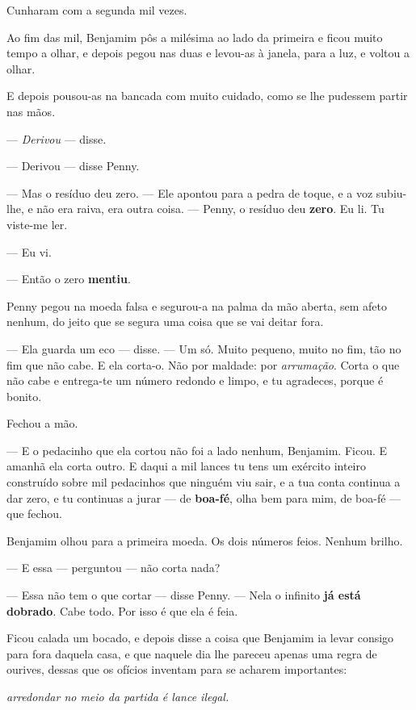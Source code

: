 \documentclass[livro.tex]{subfiles}
\begin{document}
Cunharam com a segunda mil vezes.

Ao fim das mil, Benjamim pôs a milésima ao lado da primeira e ficou muito tempo a olhar, e depois pegou nas duas e
levou-as à janela, para a luz, e voltou a olhar.

E depois pousou-as na bancada com muito cuidado, como se lhe pudessem partir nas mãos.

--- \emph{Derivou} --- disse.

--- Derivou --- disse Penny.

--- Mas o resíduo deu zero. --- Ele apontou para a pedra de toque, e a voz subiu-lhe, e não era raiva, era outra
coisa. --- Penny, o resíduo deu \textbf{zero}. Eu li. Tu viste-me ler.

--- Eu vi.

--- Então o zero \textbf{mentiu}.

\medskip

Penny pegou na moeda falsa e segurou-a na palma da mão aberta, sem afeto nenhum, do jeito que se segura uma coisa
que se vai deitar fora.

--- Ela guarda um eco --- disse. --- Um só. Muito pequeno, muito no fim, tão no fim que não cabe. E ela corta-o.
Não por maldade: por \emph{arrumação}. Corta o que não cabe e entrega-te um número redondo e limpo, e tu agradeces,
porque é bonito.

Fechou a mão.

--- E o pedacinho que ela cortou não foi a lado nenhum, Benjamim. Ficou. E amanhã ela corta outro. E daqui a mil
lances tu tens um exército inteiro construído sobre mil pedacinhos que ninguém viu sair, e a tua conta continua a
dar zero, e tu continuas a jurar --- de \textbf{boa-fé}, olha bem para mim, de boa-fé --- que fechou.

\medskip

Benjamim olhou para a primeira moeda. Os dois números feios. Nenhum brilho.

--- E essa --- perguntou --- não corta nada?

--- Essa não tem o que cortar --- disse Penny. --- Nela o infinito \textbf{já está dobrado}. Cabe todo. Por isso é
que ela é feia.

Ficou calada um bocado, e depois disse a coisa que Benjamim ia levar consigo para fora daquela casa, e que naquele
dia lhe pareceu apenas uma regra de ourives, dessas que os ofícios inventam para se acharem importantes:

\begin{center}\itshape
arredondar no meio da partida é lance ilegal.
\end{center}
\end{document}
